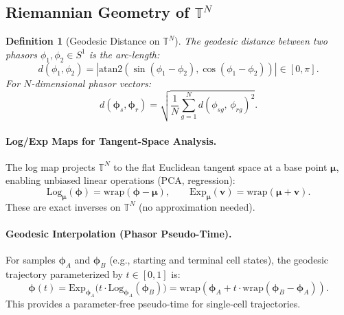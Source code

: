 \documentclass[preprint,12pt,amsmath,amssymb,superscriptaddress,floatfix]{revtex4-2}
\newtheorem{definition}{Definition}[section]
\newcommand{\torus}{\mathbb{T}}
\begin{document}
\subsection{Riemannian Geometry of $\torus^N$}
\label{subsec:manifold}

\begin{definition}[Geodesic Distance on $\torus^N$]
\label{def:geodesic}
The geodesic distance between two phasors $\phi_1, \phi_2 \in S^1$ is
the arc-length:
\begin{equation}
    d(\phi_1, \phi_2) =
    |\mathrm{atan2}(\sin(\phi_1 - \phi_2),\cos(\phi_1 - \phi_2))| \in [0,\pi].
\end{equation}
For $N$-dimensional phasor vectors:
\begin{equation}
    d(\boldsymbol{\phi}_s, \boldsymbol{\phi}_r) = \sqrt{\frac{1}{N}
    \sum_{g=1}^N d(\phi_{sg},\,\phi_{rg})^2}.
\end{equation}
\end{definition}

\paragraph{Log/Exp Maps for Tangent-Space Analysis.}
The log map projects $\torus^N$ to the flat Euclidean tangent space at a
base point $\boldsymbol{\mu}$, enabling unbiased linear operations (PCA, regression):
\begin{equation}
    \mathrm{Log}_{\boldsymbol{\mu}}(\boldsymbol{\phi}) =
    \mathrm{wrap}(\boldsymbol{\phi} - \boldsymbol{\mu}), \qquad
    \mathrm{Exp}_{\boldsymbol{\mu}}(\boldsymbol{v}) =
    \mathrm{wrap}(\boldsymbol{\mu} + \boldsymbol{v}).
\end{equation}
These are exact inverses on $\torus^N$ (no approximation needed).

\paragraph{Geodesic Interpolation (Phasor Pseudo-Time).}
For samples $\boldsymbol{\phi}_A$ and $\boldsymbol{\phi}_B$
(e.g., starting and terminal cell states), the geodesic trajectory
parameterized by $t \in [0,1]$ is:
\begin{equation}
    \boldsymbol{\phi}(t) = \mathrm{Exp}_{\boldsymbol{\phi}_A}
    \!\bigl(t \cdot \mathrm{Log}_{\boldsymbol{\phi}_A}
    (\boldsymbol{\phi}_B)\bigr) = \mathrm{wrap}
    (\boldsymbol{\phi}_A + t \cdot \mathrm{wrap}
    (\boldsymbol{\phi}_B - \boldsymbol{\phi}_A)).
\end{equation}
This provides a parameter-free pseudo-time for single-cell trajectories.
\end{document}
